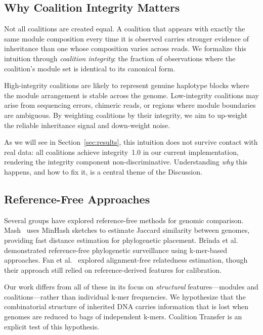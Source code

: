 \documentclass{../yalumba}
\begin{document}
\subsection{Why Coalition Integrity Matters}

Not all coalitions are created equal.  A coalition that appears with exactly
the same module composition every time it is observed carries stronger
evidence of inheritance than one whose composition varies across reads.
We formalize this intuition through \emph{coalition integrity}: the fraction
of observations where the coalition's module set is identical to its canonical
form.

High-integrity coalitions are likely to represent genuine haplotype blocks
where the module arrangement is stable across the genome.  Low-integrity
coalitions may arise from sequencing errors, chimeric reads, or regions where
module boundaries are ambiguous.  By weighting coalitions by their integrity,
we aim to up-weight the reliable inheritance signal and down-weight noise.

As we will see in Section~\ref{sec:results}, this intuition does not survive
contact with real data: all coalitions achieve integrity~1.0 in our current
implementation, rendering the integrity component non-discriminative.
Understanding \emph{why} this happens, and how to fix it, is a central
theme of the Discussion.

\subsection{Reference-Free Approaches}

Several groups have explored reference-free methods for genomic comparison.
Mash~\cite{ondov2016mash} uses MinHash sketches to estimate Jaccard
similarity between genomes, providing fast distance estimation for phylogenetic
placement.  Br\v{i}nda et al.~\cite{brinda2023phylogenetic} demonstrated
reference-free phylogenetic surveillance using k-mer-based approaches.
Fan et al.~\cite{fan2021reference} explored alignment-free relatedness
estimation, though their approach still relied on reference-derived features
for calibration.

Our work differs from all of these in its focus on \emph{structural}
features---modules and coalitions---rather than individual k-mer frequencies.
We hypothesize that the combinatorial structure of inherited DNA carries
information that is lost when genomes are reduced to bags of independent
k-mers.  Coalition Transfer is an explicit test of this hypothesis.
\end{document}
